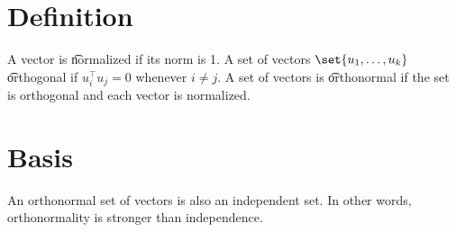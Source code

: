 
\section*{Definition}

A vector is \t{normalized} if its norm is 1.
A set of vectors $\set{u_1, \dots , u_k}$ \t{orthogonal} if $u_i^\top  u_j = 0$ whenever $i \neq j$.
A set of vectors is \t{orthonormal} if the set is orthogonal and each vector is normalized.

\section*{Basis}

An orthonormal set of vectors is also an independent set.
In other words, orthonormality is stronger than independence.

\blankpage